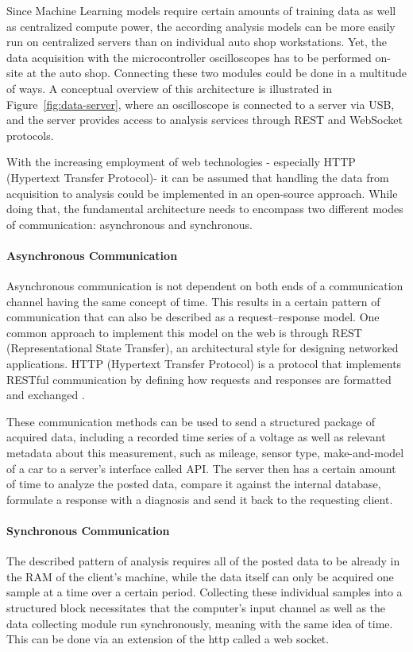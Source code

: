 Since Machine Learning models require certain amounts of training data as well as centralized compute power, 
the according analysis models can be more easily run on centralized servers than on individual auto shop workstations. 
Yet, the data acquisition with the microcontroller oscilloscopes has to be performed on-site at the auto shop. 
Connecting these two modules could be done in a multitude of ways. 
A conceptual overview of this architecture is illustrated in Figure~\ref{fig:data-server}, where an oscilloscope is connected to a server via USB, 
and the server provides access to analysis services through REST and WebSocket protocols.

With the increasing employment of web technologies - especially HTTP (Hypertext Transfer Protocol)- it can be assumed that handling the data from acquisition to analysis could be implemented in an open-source approach. 
While doing that, the fundamental architecture needs to encompass two different modes of communication: asynchronous and synchronous.

\paragraph{Asynchronous Communication}
Asynchronous communication is not dependent on both ends of a communication channel having the same concept of time. 
This results in a certain pattern of communication that can also be described as a request–response model. 
One common approach to implement this model on the web is through REST (Representational State Transfer), an architectural style for designing networked applications. 
HTTP (Hypertext Transfer Protocol) is a protocol that implements RESTful communication by defining how requests and responses are formatted and exchanged \cite{Fielding2000}.

These communication methods can be used to send a structured package of acquired data, including a recorded time series of a voltage as well as relevant metadata about this measurement, 
such as mileage, sensor type, make-and-model of a car to a server’s interface called API. 
The server then has a certain amount of time to analyze the posted data, compare it against the internal database, formulate a response with a diagnosis and send it back to the requesting client.

\paragraph{Synchronous Communication}
The described pattern of analysis requires all of the posted data to be already in the RAM of the client’s machine, while the data itself can only be acquired one sample at a time over a certain period. 
Collecting these individual samples into a structured block necessitates that the computer’s input channel as well as the data collecting module run synchronously, meaning with the same idea of time. 
This can be done via an extension of the http called a web socket.

